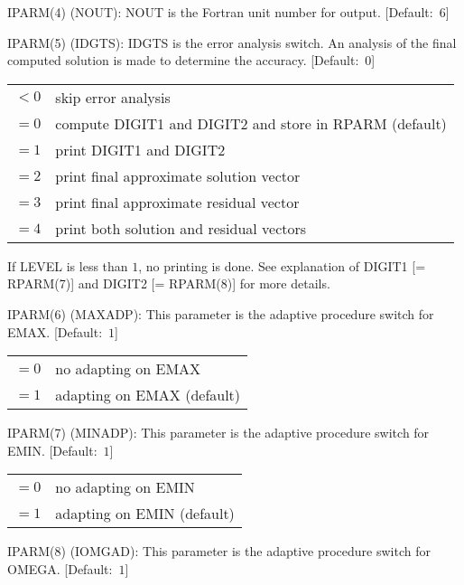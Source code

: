 \begin{list}{}{
               \leftmargin 1.00in \rightmargin 0.25in}
\item[IPARM(4) \hfill](NOUT):
         NOUT is the Fortran unit number for output.  \mbox{[Default: $6$]}
 
\item[IPARM(5) \hfill](IDGTS):
         IDGTS is the error analysis switch.  An analysis of the
         final computed solution is made to determine the
         accuracy.  \mbox{[Default: $0$]}
 
         \begin{tabular}{ll}
          $< 0$ & skip error analysis \\
          $= 0$ & compute DIGIT1 and DIGIT2 and store in RPARM 
                  (default) \\
          $= 1$ & print DIGIT1 and DIGIT2 \\
          $= 2$ & print final approximate solution vector \\
          $= 3$ & print final approximate residual vector \\
          $= 4$ & print both solution and residual vectors
         \end{tabular}
 
         If LEVEL is less than $1$, no printing is done.  See
         explanation of DIGIT1 [= RPARM(7)] and DIGIT2 [= RPARM(8)]
         for more details.
 
\item[IPARM(6) \hfill](MAXADP):
         This parameter is the adaptive procedure switch for EMAX.
         \mbox{[Default: $1$]}
 
         \begin{tabular}{ll}
          $= 0$ & no adapting on EMAX \\
          $= 1$ & adapting on EMAX (default)
         \end{tabular}
 
\item[IPARM(7) \hfill](MINADP):
         This parameter is the adaptive procedure switch for EMIN.
         \mbox{[Default: $1$]}
 
         \begin{tabular}{ll}
          $= 0$ & no adapting on EMIN \\
          $= 1$ & adapting on EMIN (default)
         \end{tabular}
 
\item[IPARM(8) \hfill](IOMGAD):
         This parameter is the adaptive procedure switch for OMEGA.
         \mbox{[Default: $1$]}
 

\end{list}
